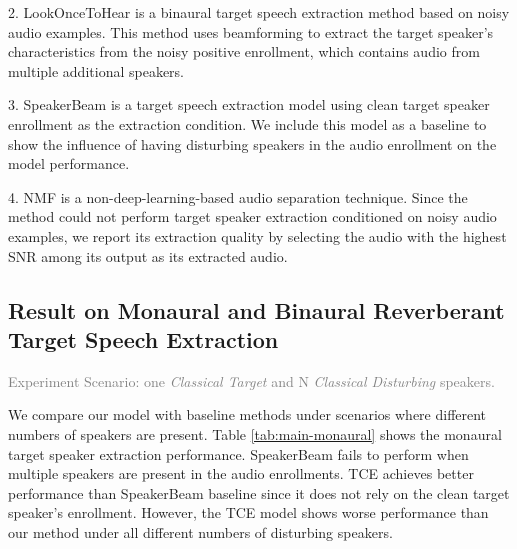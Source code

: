 
2. LookOnceToHear \cite{Veluri2024lookonce} is a binaural target speech extraction method based on noisy audio examples. This method uses beamforming to extract the target speaker's characteristics from the noisy positive enrollment, which contains audio from multiple additional speakers. 

3. SpeakerBeam \cite{speakerbeam} is a target speech extraction model using clean target speaker enrollment as the extraction condition. We include this model as a baseline to show the influence of having disturbing speakers in the audio enrollment on the model performance.

4. NMF \cite{NMF} is a non-deep-learning-based audio separation technique. Since the method could not perform target speaker extraction conditioned on noisy audio examples, we report its extraction quality by selecting the audio with the highest SNR among its output as its extracted audio. 

\subsection{Result on Monaural and Binaural Reverberant Target Speech Extraction} \label{sec:main-monaural}

\textcolor{gray}{Experiment Scenario: one \textit{Classical Target} and N \textit{Classical Disturbing} speakers.}

We compare our model with baseline methods under scenarios where different numbers of speakers are present.
Table \ref{tab:main-monaural} shows the monaural target speaker extraction performance. SpeakerBeam \cite{speakerbeam} fails to perform when multiple speakers are present in the audio enrollments. TCE \cite{Chen2024tce} achieves better performance than SpeakerBeam \cite{speakerbeam} baseline since it does not rely on the clean target speaker's enrollment. However, the TCE model shows worse performance than our method under all different numbers of disturbing speakers. 

